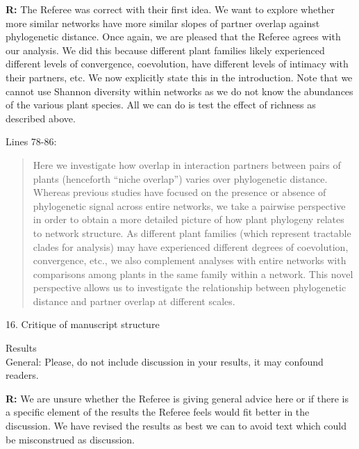 \documentclass[12pt]{letter}
\newenvironment{refquote}{\bigskip \begin{it}}{\end{it}\smallskip}
\begin{document}
		\textbf{R:} The Referee was correct with their first idea. We want to explore whether more similar networks have more similar slopes of partner overlap against phylogenetic distance. Once again, we are pleased that the Referee agrees with our analysis. We did this because different plant families likely experienced different levels of convergence, coevolution, have different levels of intimacy with their partners, etc. We now explicitly state this in the introduction. Note that we cannot use Shannon diversity within networks as we do not know the abundances of the various plant species. All we can do is test the effect of richness as described above.


		Lines 78-86:

		\begin{quotation}

			Here we investigate how overlap in interaction partners between 
			pairs of plants (henceforth ``niche overlap'') varies over 
			phylogenetic distance. 
			Whereas previous 
			studies have focused on the presence or absence of phylogenetic
			signal across entire networks, we take a pairwise perspective in
			order to obtain a more detailed picture of how plant phylogeny
			relates to network structure. As different plant families (which represent tractable clades for analysis) may have experienced different degrees of coevolution, convergence, etc., we also complement analyses with entire networks with comparisons among plants in the same family within a network. 
			This novel perspective allows us to investigate the relationship between phylogenetic distance and partner overlap at different scales. 

  		\end{quotation}


	16. Critique of manuscript structure 

		\begin{refquote}
			Results\\
			General: Please, do not include discussion in your results, it may confound readers.
		\end{refquote}

		\textbf{R:} We are unsure whether the Referee is giving general advice here or if there is a specific element of the results the Referee feels would fit better in the discussion. We have revised the results as best we can to avoid text which could be misconstrued as discussion.
\end{document}

